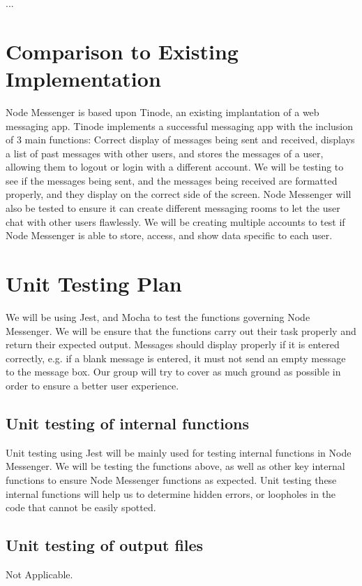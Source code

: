\documentclass[12pt, titlepage]{article}
\begin{document}
...

	
\section{Comparison to Existing Implementation}	
Node Messenger is based upon Tinode, an existing implantation of a web messaging app. Tinode implements a successful messaging app with the inclusion of 3 main functions: Correct display of messages being sent and received, displays a list of past messages with other users, and stores the messages of a user, allowing them to logout or login with a different account. We will be testing to see if the messages being sent, and the messages being received are formatted properly, and they display on the correct side of the screen. Node Messenger will also be tested to ensure it can create different messaging rooms to let the user chat with other users flawlessly. We will be creating multiple accounts to test if Node Messenger is able to store, access, and show data specific to each user.  
				
\section{Unit Testing Plan}
We will be using Jest, and Mocha to test the functions governing Node Messenger. We will be ensure that the functions carry out their task properly and return their expected output.  Messages should display properly if it is entered correctly, e.g. if a blank message is entered, it must not send an empty message to the message box. Our group will try to cover as much ground as possible in order to ensure a better user experience. 
		
\subsection{Unit testing of internal functions}
Unit testing using Jest will be mainly used for testing internal functions in Node Messenger. We will be testing the functions above, as well as other key internal functions to ensure Node Messenger functions as expected. Unit testing these internal functions will help us to determine hidden errors, or loopholes in the code that cannot be easily spotted.

\subsection{Unit testing of output files}	
Not Applicable.	
\end{document}
